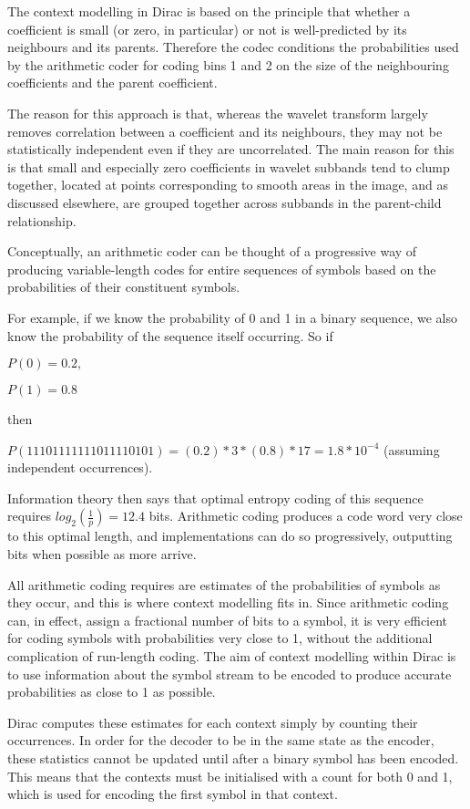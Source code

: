 The context modelling in Dirac is based on the principle that whether a
coefficient is small (or zero, in particular) or not is well-predicted
by its neighbours and its parents. Therefore the codec conditions the
probabilities used by the arithmetic coder for coding bins 1 and 2 on
the size of the neighbouring coefficients and the parent coefficient.

The reason for this approach is that, whereas the wavelet transform
largely removes correlation between a coefficient and its neighbours,
they may not be statistically independent even if they are uncorrelated.
The main reason for this is that small and especially zero coefficients
in wavelet subbands tend to clump together, located at points
corresponding to smooth areas in the image, and as discussed elsewhere,
are grouped together across subbands in the parent-child relationship.

Conceptually, an arithmetic coder can be thought of a progressive way of
producing variable-length codes for entire sequences of symbols based on
the probabilities of their constituent symbols.

For example, if we know the probability of 0 and 1 in a binary sequence,
we also know the probability of the sequence itself occurring. So if

$P(0)=0.2, $

$P(1)=0.8$

then

$P(11101111111011110101)=(0.2)*3*(0.8)*17=1.8 * 10^{-4}$ (assuming
independent occurrences).

Information theory then says that optimal entropy coding of this
sequence requires $log_2 (\frac{1}{p})=12.4$ bits. Arithmetic coding
produces a code word very close to this optimal length, and
implementations can do so progressively, outputting bits when possible
as more arrive.

All arithmetic coding requires are estimates of the probabilities of
symbols as they occur, and this is where context modelling fits in.
Since arithmetic coding can, in effect, assign a fractional number of
bits to a symbol, it is very efficient for coding symbols with
probabilities very close to 1, without the additional complication of
run-length coding. The aim of context modelling within Dirac is to use
information about the symbol stream to be encoded to produce accurate
probabilities as close to 1 as possible.

Dirac computes these estimates for each context simply by counting their
occurrences. In order for the decoder to be in the same state as the
encoder, these statistics cannot be updated until after a binary symbol
has been encoded. This means that the contexts must be initialised with
a count for both 0 and 1, which is used for encoding the first symbol in
that context.

